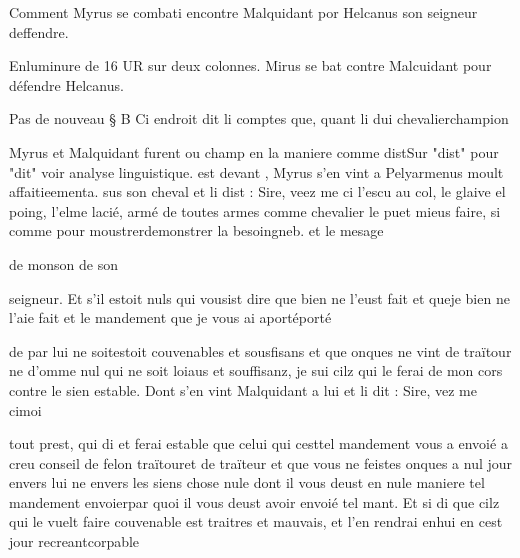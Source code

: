 \documentclass{article}
\begin{document}
\begin{pages}
         
            
                  Comment Myrus se combati
                     encontre Malquidant por Helcanus son seigneur deffendre.
            
               
               Enluminure de 16 UR sur deux colonnes. Mirus se bat contre Malcuidant pour
                  défendre Helcanus.
            
            
            \pstart Pas de nouveau § B
                     Ci endroit dit li comptes
                        que, quant li dui 
                     chevalierchampion
                  
                     Myrus et Malquidant furent ou champ en la maniere comme distSur
                     "dist" pour "dit" voir analyse linguistique. est devant , Myrus s’en vint a Pelyarmenus moult 
                     affaitieementa. sus son cheval et li dist :
               Sire, veez me ci l’escu au col, le glaive el poing,
                  l’elme lacié, armé de toutes armes comme chevalier le puet mieus faire, si comme
                  pour 
                     moustrerdemonstrer la
                     besoingneb. et le mesage
                  
                     de monson
                     de son
                  
                     seigneur. Et s’il estoit nuls qui vousist dire que 
                     bien ne l'eust fait et queje bien ne l'aie fait et le mandement que je vous ai 
                     aportéporté
                  
                     de par lui ne 
                     soitestoit couvenables 
                     et sousfisans et que onques ne vint de traïtour ne d’omme 
                     nul qui ne soit 
                     loiaus et souffisanz, je sui cilz qui le ferai de mon cors contre le sien
                  estable. Dont s’en vint Malquidant a
               lui et li dit : Sire, vez
                     me cimoi
                  
                     tout prest, qui di et ferai estable que celui qui 
                     cesttel mandement vous a envoié a creu conseil de felon 
                     traïtouret de traïteur et que vous ne feistes onques 
                     a nul jour envers lui ne envers les siens 
                     chose nule dont il vous deust 
                           en nule maniere tel mandement envoierpar quoi il vous deust avoir envoié tel mant. Et si di que cilz qui le vuelt faire couvenable est traitres 
                     et mauvais, et l’en rendrai 
                     enhui en cest jour 
                     recreantcorpable
                  

\end{pages}
\end{document}
